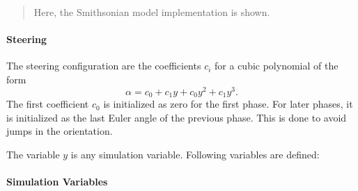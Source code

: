 \begin{quote} Here, the Smithsonian model implementation is shown.
\end{quote}

\paragraph{Steering}

The steering configuration are the coefficients \(c_i\) for a cubic
polynomial of the form \[
  \alpha = c_0 + c_1y + c_0y^2 + c_1y^3.
\] The first coefficient \(c_0\) is initialized as zero for the first
phase. For later phases, it is initialized as the last Euler angle of
the previous phase. This is done to avoid jumps in the orientation.

The variable \(y\) is any simulation variable. Following variables are
defined:

\paragraph{Simulation Variables}

